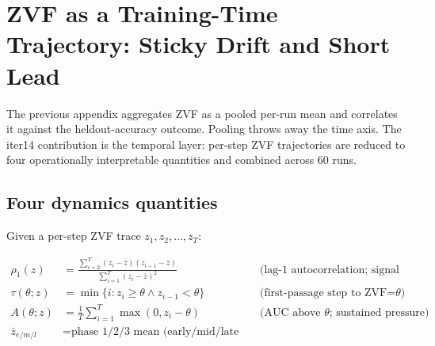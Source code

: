 %
%
%

\section{ZVF as a Training-Time Trajectory: Sticky Drift and Short Lead}
\label{sec:zvf-dynamics}

The previous appendix aggregates ZVF as a pooled per-run mean and
correlates it against the heldout-accuracy outcome. Pooling throws
away the time axis. The iter14 contribution is the temporal layer:
per-step ZVF trajectories are reduced to four
operationally interpretable quantities and combined across 60 runs.

\subsection{Four dynamics quantities}

Given a per-step ZVF trace $z_1, z_2, \dots, z_T$:

\begin{align}
  \rho_1(z) &= \frac{\sum_{i=2}^{T}(z_i-\bar z)(z_{i-1}-\bar z)}{\sum_{i=1}^{T}(z_i-\bar z)^2}
              &&\text{(lag-1 autocorrelation; signal stickiness)}\\
  \tau(\theta; z) &= \min\{i : z_i \ge \theta \wedge z_{i-1} < \theta\}
              &&\text{(first-passage step to ZVF=}\theta\text{)}\\
  A(\theta; z) &= \frac{1}{T}\sum_{i=1}^{T}\max(0, z_i - \theta)
              &&\text{(AUC above }\theta\text{; sustained pressure)}\\
  \bar z_{e/m/l} &= \text{phase 1/2/3 mean (early/mid/late thirds)}
\end{align}

